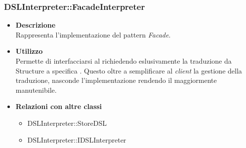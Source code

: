 \subsubsection{DSLInterpreter::FacadeInterpreter}
\begin{itemize}
\item \textbf{Descrizione} \hfill \\
  Rappresenta l'implementazione del pattern \textit{Facade}.
\item \textbf{Utilizzo} \hfill \\
  Permette di interfacciarsi al  richiedendo eslusivamente la traduzione da  Structure a specifica . Questo oltre a semplificare al \textit{client} la gestione della traduzione, nasconde l'implementazione rendendo il  maggiormente manutenibile.
\item \textbf{Relazioni con altre classi} \hfill
  \begin{itemize}
  \item DSLInterpreter::StoreDSL
  \item DSLInterpreter::IDSLInterpreter
  \end{itemize}
\end{itemize}
